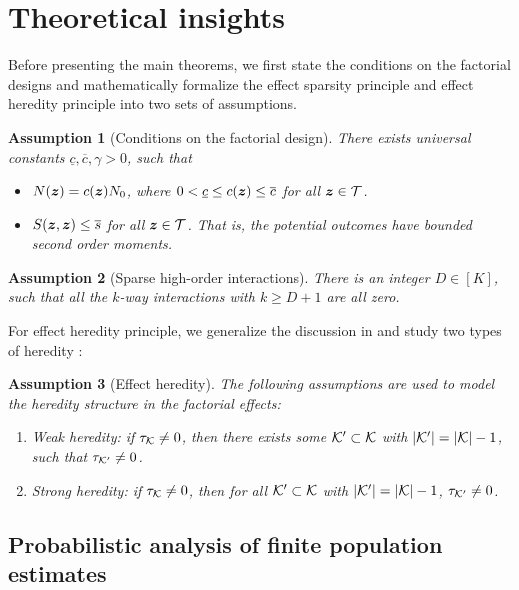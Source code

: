 \documentclass[12pt]{article}
\newtheorem{assumption}{Assumption}
\begin{document}
\section{Theoretical insights}\label{sec:theory}

Before presenting the main theorems, we first state the conditions on the factorial designs and mathematically formalize the effect sparsity principle and effect heredity principle into two sets of assumptions.



\begin{assumption}[Conditions on the factorial design]\label{assume:design}
There exists universal constants $\underline{c}, \overline{c}, \gamma > 0 $, such that 
\begin{itemize}
    \item $N({\boldsymbol{z}}) = c({\boldsymbol{z}})N_0$, where $0 < \underline{c} \le c({\boldsymbol{z}}) \le \overline{c}$ for all ${\boldsymbol{z}}\in {\mathcal{T}}$.
    \item $S({\boldsymbol{z}},{\boldsymbol{z}})\le \overline{s}$ for all ${\boldsymbol{z}}\in{\mathcal{T}}$. That is, the potential outcomes have bounded second order moments. 
\end{itemize}
\end{assumption}


\begin{assumption}[Sparse high-order interactions]\label{assume:sparse}
There is an integer $D\in[K]$, such that all the $k$-way interactions with $k\ge D+1$ are all zero. 
\end{assumption}

For effect heredity principle, we generalize the discussion in \cite{wu2011experiments} and study two types of heredity \citep{lim2015learning, hao2014interaction}:
\begin{assumption}[Effect heredity]  The following assumptions are used to model the heredity structure in the factorial effects:
\begin{enumerate}
    \item Weak heredity: if $\tau_{{\mathcal{K}}} \neq 0$, then there exists some ${\mathcal{K}}'\subset{\mathcal{K}}$ with $|{\mathcal{K}}'| = |{\mathcal{K}}| - 1$, such that $\tau_{{\mathcal{K}}'}\neq 0$.
    \item Strong heredity: if $\tau_{{\mathcal{K}}}\neq 0$, then for all ${\mathcal{K}}'\subset{\mathcal{K}}$ with $|{\mathcal{K}}'| = |{\mathcal{K}}| - 1$, $\tau_{{\mathcal{K}}'}\neq 0$. 
\end{enumerate}
\end{assumption}


\subsection{Probabilistic analysis of finite population estimates}
\end{document}

